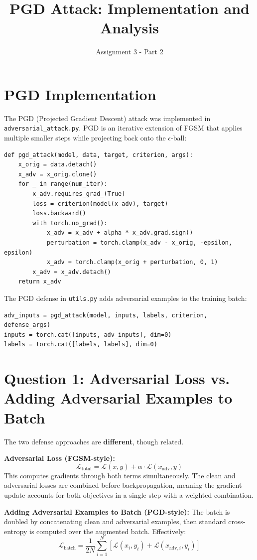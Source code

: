 \documentclass[11pt]{article}
\title{PGD Attack: Implementation and Analysis}
\author{Assignment 3 - Part 2}
\date{}
\begin{document}
\maketitle

\section{PGD Implementation}

The PGD (Projected Gradient Descent) attack was implemented in \texttt{adversarial\_attack.py}. PGD is an iterative extension of FGSM that applies multiple smaller steps while projecting back onto the $\epsilon$-ball:

\begin{verbatim}
def pgd_attack(model, data, target, criterion, args):
    x_orig = data.detach()
    x_adv = x_orig.clone()
    for _ in range(num_iter):
        x_adv.requires_grad_(True)
        loss = criterion(model(x_adv), target)
        loss.backward()
        with torch.no_grad():
            x_adv = x_adv + alpha * x_adv.grad.sign()
            perturbation = torch.clamp(x_adv - x_orig, -epsilon, epsilon)
            x_adv = torch.clamp(x_orig + perturbation, 0, 1)
        x_adv = x_adv.detach()
    return x_adv
\end{verbatim}

The PGD defense in \texttt{utils.py} adds adversarial examples to the training batch:
\begin{verbatim}
adv_inputs = pgd_attack(model, inputs, labels, criterion, defense_args)
inputs = torch.cat([inputs, adv_inputs], dim=0)
labels = torch.cat([labels, labels], dim=0)
\end{verbatim}

\section{Question 1: Adversarial Loss vs. Adding Adversarial Examples to Batch}

The two defense approaches are \textbf{different}, though related.

\textbf{Adversarial Loss (FGSM-style):}
\[
\mathcal{L}_{\text{total}} = \mathcal{L}(x, y) + \alpha \cdot \mathcal{L}(x_{\text{adv}}, y)
\]
This computes gradients through both terms simultaneously. The clean and adversarial losses are combined before backpropagation, meaning the gradient update accounts for both objectives in a single step with a weighted combination.

\textbf{Adding Adversarial Examples to Batch (PGD-style):}
The batch is doubled by concatenating clean and adversarial examples, then standard cross-entropy is computed over the augmented batch. Effectively:
\[
\mathcal{L}_{\text{batch}} = \frac{1}{2N}\sum_{i=1}^{N}\left[\mathcal{L}(x_i, y_i) + \mathcal{L}(x_{\text{adv},i}, y_i)\right]
\]
\end{document}
